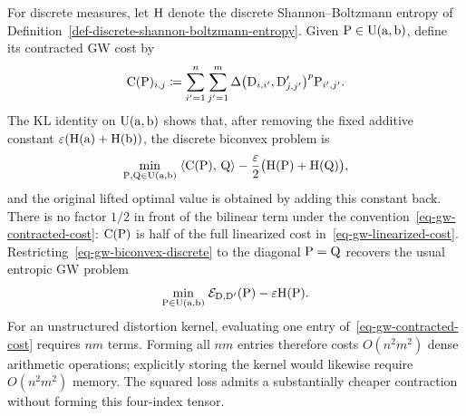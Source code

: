 For discrete measures, let $\mathrm{H}$ denote the discrete Shannon--Boltzmann entropy of Definition~\ref{def-discrete-shannon-boltzmann-entropy}. Given $\mathrm{P}\in\mathrm{U}(\mathrm{a},\mathrm{b})$, define its contracted GW cost by
\begin{equation}\label{eq-gw-contracted-cost}
\mathrm{C}(\mathrm{P})_{i,j}
\coloneqq
\sum_{i'=1}^{n}\sum_{j'=1}^{m}
\Delta\bigl(\mathrm{D}_{i,i'},\mathrm{D}'_{j,j'}\bigr)^p
\mathrm{P}_{i',j'}.
\end{equation}
The KL identity on $\mathrm{U}(\mathrm{a},\mathrm{b})$ shows that, after removing the fixed additive constant $\varepsilon(\mathrm{H}(\mathrm{a})+\mathrm{H}(\mathrm{b}))$, the discrete biconvex problem is
\begin{equation}\label{eq-gw-biconvex-discrete}
\underset{\mathrm{P},\mathrm{Q}\in\mathrm{U}(\mathrm{a},\mathrm{b})}{\min}\;
\langle \mathrm{C}(\mathrm{P}),\,\mathrm{Q}\rangle
-
\frac{\varepsilon}{2}\bigl(\mathrm{H}(\mathrm{P})+\mathrm{H}(\mathrm{Q})\bigr),
\end{equation}
and the original lifted optimal value is obtained by adding this constant back. There is no factor $1/2$ in front of the bilinear term under the convention~\eqref{eq-gw-contracted-cost}: $\mathrm{C}(\mathrm{P})$ is half of the full linearized cost in~\eqref{eq-gw-linearized-cost}. Restricting~\eqref{eq-gw-biconvex-discrete} to the diagonal $\mathrm{P}=\mathrm{Q}$ recovers the usual entropic GW problem
\begin{equation}\label{eq-gw-entropy}
\underset{\mathrm{P}\in\mathrm{U}(\mathrm{a},\mathrm{b})}{\min}\;
\mathcal{E}_{\mathrm{D},\mathrm{D}'}(\mathrm{P})-\varepsilon\mathrm{H}(\mathrm{P}).
\end{equation}
For an unstructured distortion kernel, evaluating one entry of~\eqref{eq-gw-contracted-cost} requires $nm$ terms. Forming all $nm$ entries therefore costs $O(n^2m^2)$ dense arithmetic operations; explicitly storing the kernel would likewise require $O(n^2m^2)$ memory. The squared loss admits a substantially cheaper contraction without forming this four-index tensor.

